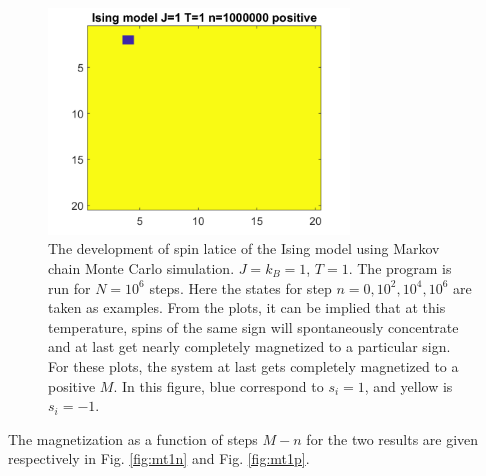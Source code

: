 \documentclass[12pt, graphicx]{article}
\begin{document}
\begin{figure}[ht]
\begin{minipage}{0.48\linewidth}
\end{minipage}
\begin{minipage}{0.48\linewidth}
\centering
\includegraphics[width = 80mm]{st1n6p.png}
\end{minipage}
\caption{The development of spin latice of the Ising model using Markov chain Monte Carlo simulation. $J=k_B=1$, $T=1$. The program is run for $N=10^6$ steps. Here the states for step $n=0,10^2,10^4,10^6$ are taken as examples. From the plots, it can be implied that at this temperature, spins of the same sign will spontaneously concentrate and at last get nearly completely magnetized to a particular sign. For these plots, the system at last gets completely magnetized to a positive $M$. In this figure, blue correspond to $s_i=1$, and yellow is $s_i=-1$.}
\label{fig:st1p}
\end{figure}

\clearpage

The magnetization as a function of steps $M-n$ for the two results are given respectively in Fig. \ref{fig:mt1n} and Fig. \ref{fig:mt1p}.\par
\end{document}
